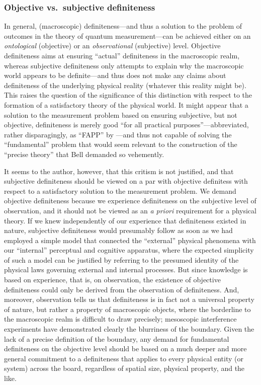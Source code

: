 \documentclass[twocolumn,rmp,aps,amsmath,amsfonts,noshowkeys,noshowpacs]{revtex4}
\newcommand{\vs}{vs.\ }
\begin{document}
\subsubsection{\label{sec:objsubj}Objective \vs subjective definiteness}

In general, (macroscopic) definiteness---and thus a solution to the
problem of outcomes in the theory of quantum measurement---can be
achieved either on an \emph{ontological} (objective) or an
\emph{observational} (subjective) level.  Objective definiteness aims
at ensuring ``actual'' definiteness in the macroscopic realm, whereas
subjective definiteness only attempts to explain why the macroscopic
world appears to be definite---and thus does not make any
claims about definiteness of the underlying physical reality (whatever
this reality might be). This raises the question of the significance
of this distinction with respect to the formation of a satisfactory
theory of the physical world. It might appear that a solution to the
measurement problem based on ensuring subjective, but not objective,
definiteness is merely good ``for all practical
purposes''---abbreviated, rather disparagingly, as ``FAPP'' by
\citet{Bell:1990:po}---and thus not capable of solving the
``fundamental'' problem that would seem relevant to the construction
of the ``precise theory'' that Bell demanded so vehemently.

It seems to the author, however, that this critism is not justified,
and that subjective definiteness should be viewed on a par with
objective definitess with respect to a satisfactory solution to the
measurement problem. We demand objective definiteness because we
experience definiteness on the subjective level of observation, and it
should not be viewed as an \emph{a priori} requirement for a physical
theory.  If we knew independently of our experience that definiteness
existed in nature, subjective definiteness would presumably follow as
soon as we had employed a simple model that connected the ``external''
physical phenomena with our ``internal'' perceptual and cognitive
apparatus, where the expected simplicity of such a model can be
justified by referring to the presumed identity of the physical laws
governing external and internal processes.  But since knowledge is
based on experience, that is, on observation, the existence of
objective definiteness could only be derived from the observation of
definiteness. And, moreover, observation tells us that definiteness is
in fact not a universal property of nature, but rather a property of
macroscopic objects, where the borderline to the macroscopic realm is
difficult to draw precisely; mesoscopic interference experiments have
demonstrated clearly the blurriness of the boundary. Given the lack of
a precise definition of the boundary, any demand for fundamental
definiteness on the objective level should be based on a much deeper
and more general commitment to a definiteness that applies to
every physical entity (or system) across the board, regardless
of spatial size, physical property, and the like.
\end{document}
